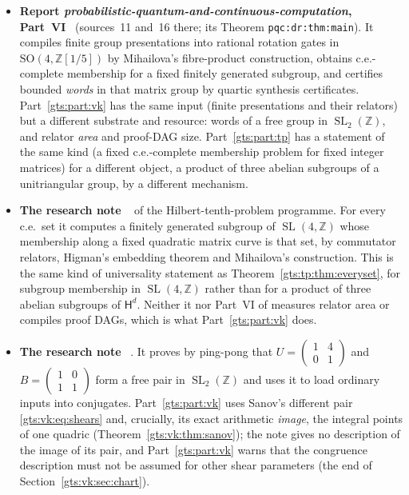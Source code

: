 \documentclass[11pt,letterpaper]{article}
\theoremstyle{definition}
\theoremstyle{remark}
\newcommand{\Z}{\mathbb Z}
\newcommand{\SL}{\operatorname{SL}}
\newcommand{\smallmat}[4]{\begin{pmatrix}#1&#2\\#3&#4\end{pmatrix}}
\newcommand{\HH}{\mathsf H}
\begin{document}
\begin{itemize}
\item \textbf{Report \emph{probabilistic-quantum-and-continuous-computation}, Part~VI}~\cite{pqc} (sources~11 and~16 there; its Theorem \texttt{pqc:dr:thm:main}). It compiles finite group presentations into rational rotation gates in $\mathrm{SO}(4,\Z[1/5])$ by Mihailova's fibre-product construction, obtains c.e.-complete membership for a fixed finitely generated subgroup, and certifies bounded \emph{words} in that matrix group by quartic synthesis certificates. Part~\ref{gts:part:vk} has the same input (finite presentations and their relators) but a different substrate and resource: words of a free group in $\SL_2(\Z)$, and relator \emph{area} and proof-DAG size. Part~\ref{gts:part:tp} has a statement of the same kind (a fixed c.e.-complete membership problem for fixed integer matrices) for a different object, a product of three abelian subgroups of a unitriangular group, by a different mechanism.
\item \textbf{The research note }~\cite{repo-comm} of the Hilbert-tenth-problem programme. For every c.e.\ set it computes a finitely generated subgroup of $\SL(4,\Z)$ whose membership along a fixed quadratic matrix curve is that set, by commutator relators, Higman's embedding theorem and Mihailova's construction. This is the same kind of universality statement as Theorem~\ref{gts:tp:thm:everyset}, for subgroup membership in $\SL(4,\Z)$ rather than for a product of three abelian subgroups of $\HH^d$. Neither it nor Part~VI of \cite{pqc} measures relator area or compiles proof DAGs, which is what Part~\ref{gts:part:vk} does.
\item \textbf{The research note }~\cite{repo-unip}. It proves by ping-pong that $U=\smallmat1401$ and $B=\smallmat1011$ form a free pair in $\SL_2(\Z)$ and uses it to load ordinary inputs into conjugates. Part~\ref{gts:part:vk} uses Sanov's different pair \eqref{gts:vk:eq:shears} and, crucially, its exact arithmetic \emph{image}, the integral points of one quadric (Theorem~\ref{gts:vk:thm:sanov}); the note gives no description of the image of its pair, and Part~\ref{gts:part:vk} warns that the congruence description must not be assumed for other shear parameters (the end of Section~\ref{gts:vk:sec:chart}).

\end{itemize}
\end{document}
